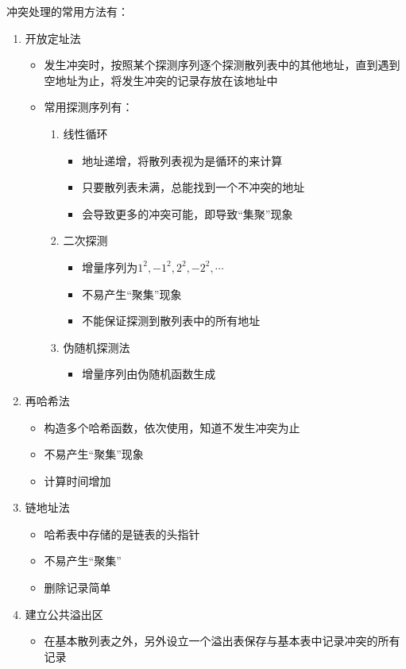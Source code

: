\documentclass[a4paper,11pt]{article}%
\begin{document}
冲突处理的常用方法有：
\begin{enumerate}
\item 开放定址法
\begin{itemize}
    \item 发生冲突时，按照某个探测序列逐个探测散列表中的其他地址，直到遇到空地址为止，将发生冲突的记录存放在该地址中
    \item 常用探测序列有：
    \begin{enumerate}
        \item 线性循环
        \begin{itemize}
            \item 地址递增，将散列表视为是循环的来计算
            \item 只要散列表未满，总能找到一个不冲突的地址
            \item 会导致更多的冲突可能，即导致“集聚”现象
        \end{itemize}
        \item 二次探测
        \begin{itemize}
            \item 增量序列为$1^2,-1^2,2^2,-2^2,\cdots$
            \item 不易产生“聚集”现象
            \item 不能保证探测到散列表中的所有地址
        \end{itemize}
        \item 伪随机探测法
        \begin{itemize}
            \item 增量序列由伪随机函数生成
        \end{itemize}
    \end{enumerate}
\end{itemize}
\item 再哈希法
\begin{itemize}
    \item 构造多个哈希函数，依次使用，知道不发生冲突为止
    \item 不易产生“聚集”现象
    \item 计算时间增加
\end{itemize}
\item 链地址法
\begin{itemize}
    \item 哈希表中存储的是链表的头指针
    \item 不易产生“聚集”
    \item 删除记录简单
\end{itemize}
\item 建立公共溢出区
\begin{itemize}
    \item 在基本散列表之外，另外设立一个溢出表保存与基本表中记录冲突的所有记录
\end{itemize}
\end{enumerate}
\end{document}

